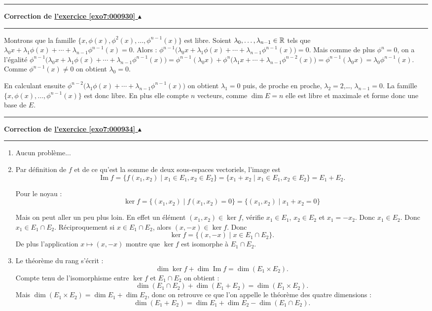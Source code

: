 \documentclass[11pt,a4paper]{article}
\renewcommand{\Im}{\mathop{\mathrm{Im}}\nolimits}
\newcounter{exo}
\newcommand{\correction}[1]{\hypertarget{cor7:#1}{}\label{cor7:#1}{\bf Correction de \hyperlink{exo7:#1}{l'exercice \ref{exo7:#1} $\blacktriangle$}}\vspace{1mm}\hrule\vspace{1mm}}
\newcommand{\fincorrection}{\vspace{1mm}\hrule\vspace*{7mm}}
\begin{document}
\fincorrection
\correction{000930}
Montrons que la famille  $\{ x,\phi(x),\phi^2(x), \ldots , \phi ^{n-1}(x) \}$ est
libre. Soient  $\lambda _0, \ldots , \lambda _{n-1} \in {\mathbb{R}}$ tels
que  $\lambda _0 x + \lambda_1\phi(x)+\cdots + \lambda _{n-1} \phi ^{n-1}(x)=0$.
Alors : $\phi ^{n-1} \big(\lambda _0 x+ \lambda_1\phi(x) + \cdots + \lambda _{n-1}
\phi ^{n-1}(x)\big)=0$. Mais comme de plus $\phi ^n=0 $, on a
l'\'egalit\'e $\phi ^{n-1} \big(\lambda _0 x+ \lambda_1\phi(x) + \cdots + \lambda
_{n-1} \phi ^{n-1}(x)\big)=\phi ^{n-1} (\lambda _0 x ) + \phi
^n \big(\lambda _1 x+ \cdots + \lambda _{n-1} \phi
^{n-2}(x)\big)= \phi ^{n-1}(\lambda _0x)=\lambda _0 \phi ^{n-1}(x)$. Comme  $\phi
^{n-1}(x) \not= 0$  on obtient  $\lambda _0=0$.

\noindent En calculant ensuite  $\phi ^{n-2}\big(\lambda _1 \phi
(x )+ \cdots + \lambda _{n-1} \phi ^{n-1}(x)\big)$  on obtient
$\lambda _1=0$  puis, de proche en proche,  $\lambda_2=2$,\ldots, $\lambda _{n-1}=0$. 
La famille  $\{ x, \phi(x), \ldots , \phi
^{n-1}(x) \}$  est donc libre. En plus elle compte  $n$  vecteurs, comme
$\dim E=n$  elle est libre et maximale et forme donc une base
de $E$.
\fincorrection
\correction{000934}
\begin{enumerate}
  \item Aucun problème...
  \item Par d\'efinition de $f$ et de ce qu'est la somme de deux sous-espaces vectoriels, l'image est
$$\Im f =  \{ f(x_1,x_2) \mid x_1 \in E_1, x_2\in E_2 \} = \{ x_1+x_2 \mid x_1 \in E_1, x_2\in E_2 \} = E_1 + E_2.$$

Pour le noyau :
$$\ker f = \{ (x_1,x_2) \mid f(x_1,x_2)=0 \} = \{ (x_1,x_2) \mid x_1+x_2=0 \}$$

Mais on peut aller un peu plus loin. En effet un \'el\'ement $(x_1,x_2) \in \ker f$,
v\'erifie $x_1\in E_1$, $x_2\in E_2$ et $x_1=-x_2$. Donc $x_1 \in E_2$. Donc $x_1\in E_1 \cap E_2$.
R\'eciproquement si $x\in E_1 \cap E_2$, alors $(x,-x)\in \ker f$.
Donc 
$$\ker f = \{ (x,-x) \mid x \in  E_1 \cap E_2 \}. $$
De plus l'application $x \mapsto (x,-x)$ montre que $\ker f$ est isomorphe \`a $E_1 \cap E_2$.

\item Le th\'eor\`eme du rang s'\'ecrit :
$$\dim \ker f+ \dim \Im f = \dim (E_1\times E_2).$$
Compte tenu de  l'isomorphisme entre $\ker f$ et $E_1 \cap E_2$ on obtient :
$$\dim (E_1 \cap E_2) + \dim (E_1+E_2) = \dim (E_1\times E_2).$$
Mais $\dim (E_1\times E_2) = \dim E_1 + \dim E_2$, donc on retrouve ce que l'on appelle le th\'eor\`eme des quatre dimensions :
$$\dim (E_1+E_2) = \dim E_1+\dim E_2-\dim (E_1 \cap E_2).$$

\end{enumerate}
\end{document}
